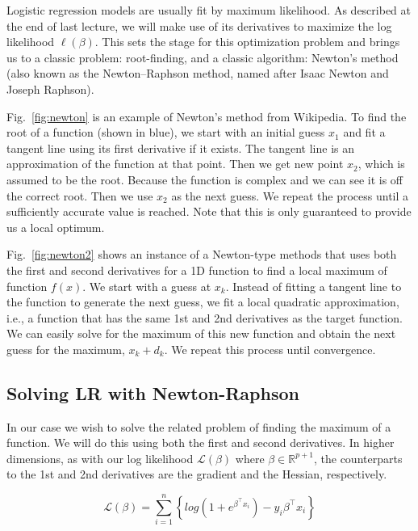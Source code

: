 \documentclass[a4paper]{article}
\begin{document}
Logistic regression models are usually fit by maximum likelihood. As described at the end of last lecture, we will make use of its derivatives to maximize the log likelihood $\ell(\beta)$. This sets the stage for this optimization problem and brings us to a classic problem: root-finding, and a classic algorithm: Newton's method (also known as the Newton–Raphson method, named after Isaac Newton and Joseph Raphson). 

Fig.\ \ref{fig:newton} is an example of Newton's method from Wikipedia. To find the root of a function (shown in blue), we start with an initial guess $x_1$ and fit a tangent line using its first derivative if it exists. The tangent line is an approximation of the function at that point. Then we get new point $x_2$, which is assumed to be the root. Because the function is complex and we can see it is off the correct root. Then we use $x_2$ as the next guess. We repeat the process until a sufficiently accurate value is reached. Note that this is only guaranteed to provide us a local optimum.

Fig.\ \ref{fig:newton2} shows an instance of a Newton-type methods that uses both the first and second derivatives for a 1D function to find a local maximum of function $f(x)$. We start with a guess at $x_k$. Instead of fitting a tangent line to the function to generate the next guess, we fit a local quadratic approximation, i.e., a function that has the same 1st and 2nd derivatives as the target function. We can easily solve for the maximum of this new function and obtain the next guess for the maximum, $x_k+d_k$. We repeat this process until convergence.

\subsection{Solving LR with Newton-Raphson}
In our case we wish to solve the related problem of finding the maximum of a function. We will do this using both the first and second derivatives. In higher dimensions, as with our log likelihood $\mathcal{L}(\beta)$ where $\beta\in\mathbb{R}^{p+1}$, the counterparts to the 1st and 2nd derivatives are the gradient and the Hessian, respectively.
 

\begin{equation}
\mathcal{L}(\beta) = \sum_{i=1}^n \left \{ log(1+ e^{\beta ^\top x_i})  -  y_i \beta ^\top x_i \right \}
\label{eqn:llgrad}
	\end{equation}
    
\end{document}

